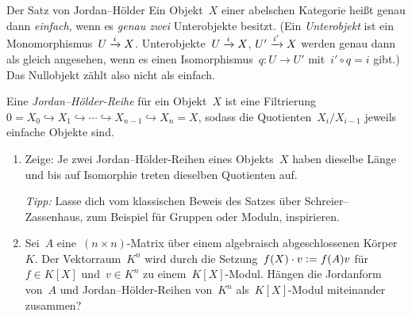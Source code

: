 \documentclass{uebblatt}
\begin{document}
\begin{aufgabe}{Der Satz von Jordan--Hölder}
Ein Objekt~$X$ einer abelschen Kategorie heißt genau dann \emph{einfach}, wenn
es \emph{genau zwei} Unterobjekte besitzt. (Ein \emph{Unterobjekt} ist ein
Monomorphismus~$U \xrightarrow{i} X$. Unterobjekte~$U \xrightarrow{i} X$, $U' \xrightarrow{i'} X$
werden genau dann als gleich angesehen, wenn es einen Isomorphismus~$q : U \to
U'$ mit~$i' \circ q = i$ gibt.) Das Nullobjekt zählt also nicht als einfach.

Eine \emph{Jordan--Hölder-Reihe} für ein Objekt~$X$ ist eine Filtrierung
$0 = X_0 \hookrightarrow X_1 \hookrightarrow \cdots \hookrightarrow X_{n-1}
\hookrightarrow X_n = X$, sodass die Quotienten~$X_i/X_{i-1}$ jeweils einfache
Objekte sind.
\begin{enumerate}
\item Zeige: Je zwei Jordan--Hölder-Reihen eines Objekts~$X$ haben dieselbe
Länge und bis auf Isomorphie treten dieselben Quotienten auf.

{\tiny\emph{Tipp:} Lasse dich vom klassischen Beweis des Satzes über
Schreier--Zassenhaus, zum Beispiel für Gruppen oder Moduln, inspirieren.\par}
\item Sei~$A$ eine~$(n \times n)$-Matrix über einem algebraisch abgeschlossenen
Körper~$K$. Der Vektorraum~$K^n$ wird durch die Setzung~$f(X) \cdot v \vcentcolon= f(A)v$
für~$f \in K[X]$ und~$v \in K^n$ zu einem~$K[X]$-Modul. Hängen die
Jordanform von~$A$ und Jordan--Hölder-Reihen von~$K^n$ als~$K[X]$-Modul
miteinander zusammen?
\end{enumerate}
\end{aufgabe}
\end{document}
